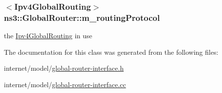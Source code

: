 \subsubsection[{\texorpdfstring{m\+\_\+routing\+Protocol}{m_routingProtocol}}]{$<${\bf Ipv4\+Global\+Routing}$>$ ns3\+::\+Global\+Router\+::m\+\_\+routing\+Protocol\hspace{0.3cm}{\ttfamily [private]}}\hypertarget{classns3_1_1GlobalRouter_a0a18bfb8e4f788c0e3027dcc603155a4}{}\label{classns3_1_1GlobalRouter_a0a18bfb8e4f788c0e3027dcc603155a4}


the \hyperlink{classns3_1_1Ipv4GlobalRouting}{Ipv4\+Global\+Routing} in use 



The documentation for this class was generated from the following files\+:\begin{DoxyCompactItemize}
\item 
internet/model/\hyperlink{global-router-interface_8h}{global-\/router-\/interface.\+h}\item 
internet/model/\hyperlink{global-router-interface_8cc}{global-\/router-\/interface.\+cc}\end{DoxyCompactItemize}
